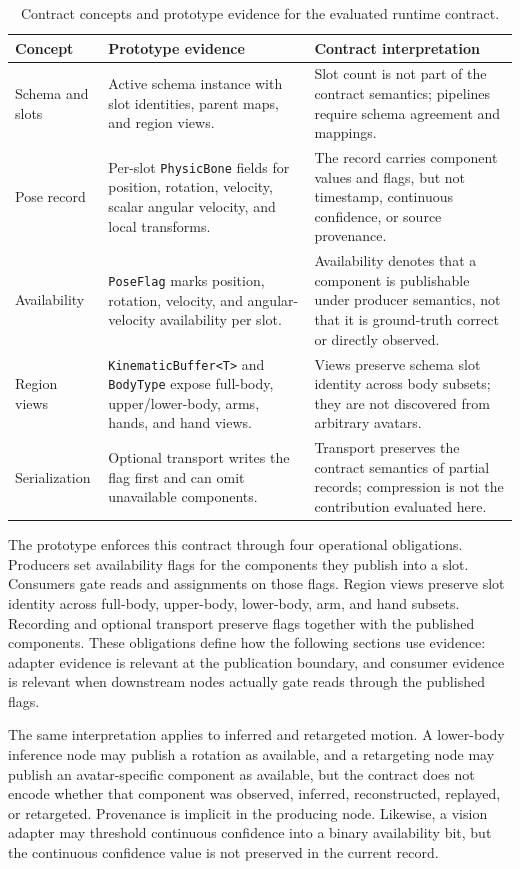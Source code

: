 \documentclass[runningheads]{llncs}
\begin{document}
\begin{table}[t]
\caption{Contract concepts and prototype evidence for the evaluated runtime contract.}\label{tab:contract}
\centering
\scriptsize
\begin{tabular}{@{}P{23mm}P{48mm}P{48mm}@{}}
\toprule
Concept & Prototype evidence & Contract interpretation \\
\midrule
Schema and slots & Active schema instance with slot identities, parent maps, and region views. & Slot count is not part of the contract semantics; pipelines require schema agreement and mappings. \\
Pose record & Per-slot \texttt{PhysicBone} fields for position, rotation, velocity, scalar angular velocity, and local transforms. & The record carries component values and flags, but not timestamp, continuous confidence, or source provenance. \\
Availability & \texttt{PoseFlag} marks position, rotation, velocity, and angular-velocity availability per slot. & Availability denotes that a component is publishable under producer semantics, not that it is ground-truth correct or directly observed. \\
Region views & \texttt{KinematicBuffer<T>} and \texttt{BodyType} expose full-body, upper/lower-body, arms, hands, and hand views. & Views preserve schema slot identity across body subsets; they are not discovered from arbitrary avatars. \\
Serialization & Optional transport writes the flag first and can omit unavailable components. & Transport preserves the contract semantics of partial records; compression is not the contribution evaluated here. \\
\bottomrule
\end{tabular}
\end{table}

The prototype enforces this contract through four operational obligations. Producers set availability flags for the components they publish into a slot. Consumers gate reads and assignments on those flags. Region views preserve slot identity across full-body, upper-body, lower-body, arm, and hand subsets. Recording and optional transport preserve flags together with the published components. These obligations define how the following sections use evidence: adapter evidence is relevant at the publication boundary, and consumer evidence is relevant when downstream nodes actually gate reads through the published flags.

The same interpretation applies to inferred and retargeted motion. A lower-body inference node may publish a rotation as available, and a retargeting node may publish an avatar-specific component as available, but the contract does not encode whether that component was observed, inferred, reconstructed, replayed, or retargeted. Provenance is implicit in the producing node. Likewise, a vision adapter may threshold continuous confidence into a binary availability bit, but the continuous confidence value is not preserved in the current record.
\end{document}

